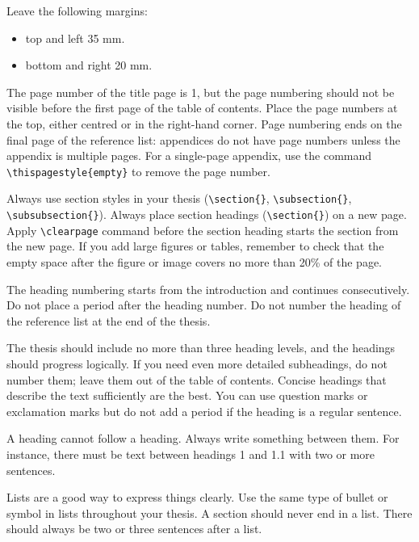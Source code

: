 Leave the following margins:
\begin{itemize}
    \item top and left 35 mm.
    \item bottom and right 20 mm. 
\end{itemize}

The page number of the title page is 1, but the page numbering should not be visible before the first page of the table of contents. Place the page numbers at the top, either centred or in the right-hand corner. Page numbering ends on the final page of the reference list: appendices do not have page numbers unless the appendix is multiple pages. For a single-page appendix, use the command \verb|\thispagestyle{empty}| to remove the page number.

Always use section styles in your thesis (\verb|\section{}|, \verb|\subsection{}|, \verb|\subsubsection{}|). Always place section headings (\verb|\section{}|) on a new page. Apply \verb|\clearpage| command before the section heading starts the section from the new page. If you add large figures or tables, remember to check that the empty space after the figure or image covers no more than 20\% of the page. 

The heading numbering starts from the introduction and continues consecutively. Do not place a period after the heading number. Do not number the heading of the reference list at the end of the thesis.

The thesis should include no more than three heading levels, and the headings should progress logically. If you need even more detailed subheadings, do not number them; leave them out of the table of contents. Concise headings that describe the text sufficiently are the best. You can use question marks or exclamation marks but do not add a period if the heading is a regular sentence.

A heading cannot follow a heading. Always write something between them. For instance, there must be text between headings 1 and 1.1 with two or more sentences.

Lists are a good way to express things clearly. Use the same type of bullet or symbol in lists throughout your thesis. A section should never end in a list. There should always be two or three sentences after a list. 

\clearpage %